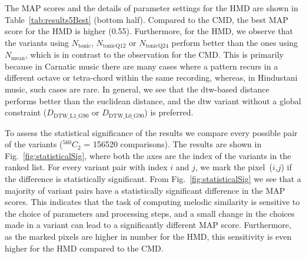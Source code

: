 The MAP scores and the details of parameter settings for the HMD are shown in Table~\ref{tab:results5Best} (bottom half). Compared to the CMD, the best MAP score for the HMD is higher (0.55).    Furthermore, for the HMD, we observe that the variants using $N_{\mathrm{tonic}}$, $N_{\mathrm{tonicQ12}}$ or $N_{\mathrm{tonicQ24}}$ perform better than the ones using $N_{\mathrm{mean}}$, which is in contrast to the observation for the CMD. This is primarily because in Carnatic music there are many cases where a pattern recurs in a different octave or tetra-chord within the same recording, whereas, in Hindustani music, such cases are rare. In general, we see that the \gls{dtw}-based distance performs better than the euclidean distance, and the \gls{dtw} variant without a global constraint ($D_{\mathrm{DTW\_L1\_G90}}$ or $D_{\mathrm{DTW\_L0\_G90}}$) is preferred. 




To assess the statistical significance of the results we compare every possible pair of the variants ($^{560}C_{2}$ = 156520 comparisons). The results are shown in Fig.~\ref{fig:statisticalSig}, where both the axes are the index of the variants in the ranked list. For every variant pair with index $i$ and $j$, we mark the pixel~($i$,$j$) if the difference is statistically significant. From Fig.~\ref{fig:statisticalSig} we see that a majority of variant pairs have a statistically significant difference in the MAP scores. This indicates that the task of computing melodic similarity is sensitive to the choice of parameters and processing steps, and a small change in the choices made in a variant can lead to a significantly different MAP score. Furthermore, as the marked pixels are higher in number for the HMD, this sensitivity is even higher for the HMD compared to the CMD.



